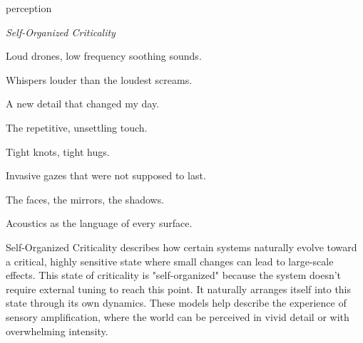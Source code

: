\begin{center}
\Huge perception
\vspace{2cm}
\begin{flushright}
\large
\textit{Self-Organized Criticality}
\end{flushright}
\vspace{2cm}
\end{center}
\normalsize

Loud drones, low frequency soothing sounds.

Whispers louder than the loudest screams. 

A new detail that changed my day. 

The repetitive, unsettling  touch.

Tight knots, tight hugs.

Invasive gazes that were not supposed to last.

The faces, the mirrors, the shadows. 

Acoustics as the language of every surface.


Self-Organized Criticality describes how certain systems naturally evolve toward a critical, highly sensitive state where small changes can lead to large-scale effects. This state of criticality is "self-organized" because the system doesn’t require external tuning to reach this point. It naturally arranges itself into this state through its own dynamics. These models help describe the experience of sensory amplification, where the world can be perceived in vivid detail or with overwhelming intensity. \citep{adami1993}

